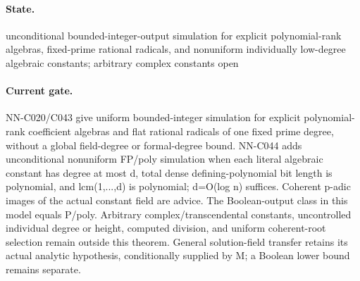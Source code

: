 \paragraph{State.} unconditional bounded-integer-output simulation for explicit polynomial-rank algebras, fixed-prime rational radicals, and nonuniform individually low-degree algebraic constants; arbitrary complex constants open
\paragraph{Current gate.} NN-C020/C043 give uniform bounded-integer simulation for explicit polynomial-rank coefficient algebras and flat rational radicals of one fixed prime degree, without a global field-degree or formal-degree bound. NN-C044 adds unconditional nonuniform FP/poly simulation when each literal algebraic constant has degree at most d, total dense defining-polynomial bit length is polynomial, and lcm(1,...,d) is polynomial; d=O(log n) suffices. Coherent p-adic images of the actual constant field are advice. The Boolean-output class in this model equals P/poly. Arbitrary complex/transcendental constants, uncontrolled individual degree or height, computed division, and uniform coherent-root selection remain outside this theorem. General solution-field transfer retains its actual analytic hypothesis, conditionally supplied by M; a Boolean lower bound remains separate.
